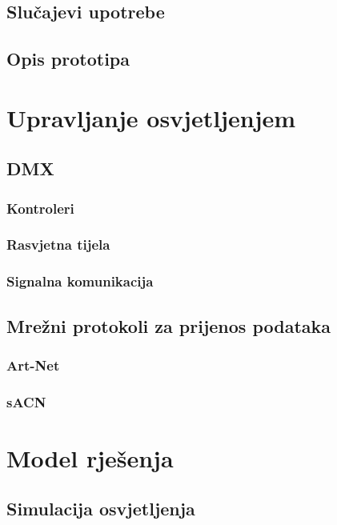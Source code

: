 \documentclass[times, utf8, zavrsni, numeric]{fer}
\begin{document}
\section{Slučajevi upotrebe}

\section{Opis prototipa}

\chapter{Upravljanje osvjetljenjem}

\section{DMX}

\subsection{Kontroleri}

\subsection{Rasvjetna tijela}

\subsection{Signalna komunikacija}

\section{Mrežni protokoli za prijenos podataka}

\subsection{Art-Net}

\subsection{sACN}

\chapter{Model rješenja}

\section{Simulacija osvjetljenja}
\end{document}
